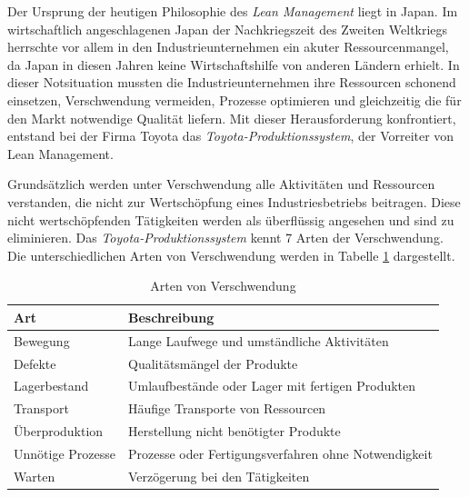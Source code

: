 Der Ursprung der heutigen Philosophie des \textit{Lean Management} liegt in Japan. Im wirtschaftlich angeschlagenen Japan der Nachkriegszeit des Zweiten Weltkriegs herrschte vor allem in den Industrieunternehmen ein akuter Ressourcenmangel, da Japan in diesen Jahren keine Wirtschaftshilfe von anderen Ländern erhielt. In dieser Notsituation mussten die Industrieunternehmen ihre Ressourcen schonend einsetzen, Verschwendung vermeiden, Prozesse optimieren und gleichzeitig die für den Markt notwendige Qualität liefern.
Mit dieser Herausforderung konfrontiert, entstand bei der Firma Toyota das \textit{Toyota-Produktionssystem}, der Vorreiter von Lean Management.
\cite{Morgan.2006}

Grundsätzlich werden unter Verschwendung alle Aktivitäten und Ressourcen verstanden, die nicht zur Wertschöpfung eines Industriesbetriebs beitragen. Diese nicht wertschöpfenden Tätigkeiten werden als überflüssig angesehen und sind zu eliminieren.
Das \textit{Toyota-Produktionssystem} kennt 7 Arten der Verschwendung. Die unterschiedlichen Arten von Verschwendung werden in Tabelle \ref{tab:Arten von Verschwendung} dargestellt.

\begin{table}[H]
	\centering
	\begin{tabularx}{\textwidth}{l X} 
		\toprule
		\textbf{Art}  &   
		\textbf{Beschreibung}  \\ 		\midrule
		
		Bewegung &   
		Lange Laufwege und umständliche Aktivitäten  \\  \cmidrule(r){1-1} \cmidrule(r){2-2}
		
		Defekte &   
		Qualitätsmängel der Produkte \\ \cmidrule(r){1-1} \cmidrule(r){2-2}
		
		Lagerbestand &   
		Umlaufbestände oder Lager mit fertigen Produkten  \\ \cmidrule(r){1-1} \cmidrule(r){2-2}
		
		Transport &   
		Häufige Transporte von Ressourcen  \\ \cmidrule(r){1-1} \cmidrule(r){2-2}
		
		Überproduktion &   
	    Herstellung nicht benötigter Produkte \\ \cmidrule(r){1-1} \cmidrule(r){2-2}
		
		Unnötige Prozesse &   
		Prozesse oder Fertigungsverfahren ohne Notwendigkeit  \\ \cmidrule(r){1-1} \cmidrule(r){2-2}
		
		Warten &   
		Verzögerung bei den Tätigkeiten  \\
	    \bottomrule
	\end{tabularx}
	\caption{\label{tab:Arten von Verschwendung}Arten von Verschwendung}
\end{table}

